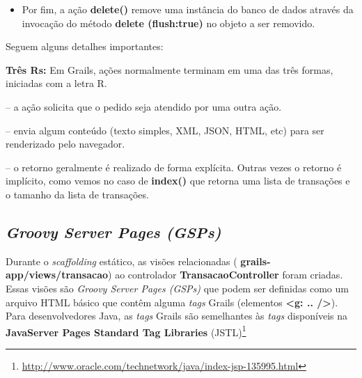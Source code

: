 \begin{itemize}
\vspace{0.3cm}

\item Por  fim, a  ação {\bf delete()}  remove uma  instância do banco  de dados
  através  da invocação  do método  {\bf delete  (flush:true)} no  objeto  a ser
  removido.

\end{itemize}

\vspace{0.3cm}

Seguem alguns detalhes importantes:

\vspace{0.3cm}

\begin{cBox}
\begin{small}
{\bf Três  Rs:} Em Grails,  ações normalmente terminam  em uma das  três formas,
iniciadas com a letra R.

\vspace{0.3cm}
  -- a ação  solicita que o pedido  seja atendido
por uma outra ação.

\vspace{0.3cm}
  -- envia algum conteúdo (texto  simples, XML, JSON,
HTML, etc) para ser renderizado pelo navegador.

\vspace{0.3cm}
 --  o retorno geralmente é realizado  de forma explícita.
Outras vezes  o retorno  é implícito, como  vemos no  caso de {\bf  index()} que
retorna uma lista de transações e o tamanho da lista de transações.  
\end{small}
\end{cBox}

\subsection{{\it Groovy Server Pages (GSPs)}}

\vspace{0.3cm}

Durante   o   {\it  scaffolding}   estático,   as   visões  relacionadas   ({\bf
  grails-app/views/transacao})  ao controlador  {\bf  TransacaoController} foram
criadas.  Essas  visões são  {\it  Groovy Server  Pages  (GSPs)}  que podem  ser
definidas  como um  arquivo  HTML básico  que  contêm alguma  {\it tags}  Grails
(elementos {\bf <g:  ..  />}).  Para desenvolvedores Java,  as {\it tags} Grails
são semelhantes às {\it tags}  disponíveis na {\bf JavaServer Pages Standard Tag
  Libraries}
(JSTL)\footnote{\url{http://www.oracle.com/technetwork/java/index-jsp-135995.html}}

